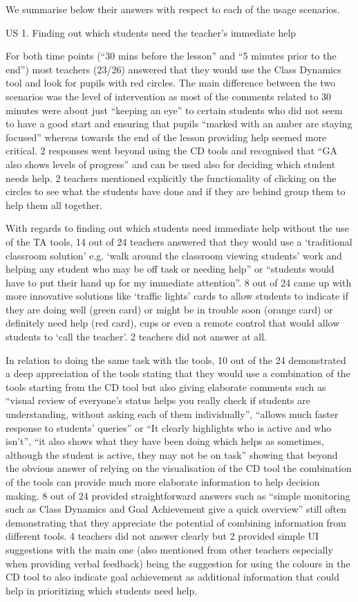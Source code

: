 We summarise below their answers with respect to each of the usage scenarios.

US 1. Finding out which students need the teacher’s immediate help
 
For both time points (“30 mins before the lesson” and “5 minutes prior
to the end”) most teachers (23/26) answered that they would use the
Class Dynamics tool and look for pupils with red circles. The main
difference between the two scenarios was the level of intervention as
most of the comments related to 30 minutes were about just “keeping an
eye” to certain students who did not seem to have a good start and
ensuring that pupils “marked with an amber are staying focused”
whereas towards the end of the lesson providing help seemed more
critical. 2 responses went beyond using the CD tools and recognised
that “GA also shows levels of progress” and can be used also for
deciding which student needs help. 2 teachers mentioned explicitly the
functionality of clicking on the circles to see what the students have
done and if they are behind group them to help them all together. 
 
With regards to finding out which students need immediate help without
the use of the TA tools, 14 out of 24 teachers answered that they
would use a ‘traditional classroom solution’ e.g. ‘walk around the
classroom viewing students’ work and helping any student who may be
off task or needing help” or “students would have to put their hand up
for my immediate attention”. 8 out of 24 came up with more innovative
solutions like ‘traffic lights’ cards to allow students to indicate if
they are doing well (green card) or might be in trouble soon (orange
card) or definitely need help (red card), cups or even a remote
control that would allow students to ‘call the teacher’. 2 teachers
did not answer at all.

In relation to doing the same task with the tools, 10 out of the 24
demonstrated a deep appreciation of the tools stating that they would
use a combination of the tools starting from the CD tool but also
giving elaborate comments such as “visual review of everyone’s status
helps you really check if students are understanding, without asking
each of them individually”, “allows much faster response to students’
queries” or “It clearly highlights who is active and who isn’t”, “it
also shows what they have been doing which helps as sometimes,
although the student is active, they may not be on task” showing that
beyond the obvious answer of relying on the visualisation of the CD
tool the combination of the tools can provide much more elaborate
information to help decision making. 8 out of 24 provided
straightforward answers such as “simple monitoring such as Class
Dynamics and Goal Achievement give a quick overview” still often
demonstrating that they appreciate the potential of combining
information from different tools. 4 teachers did not answer clearly
but 2 provided simple UI suggestions with the main one (also mentioned
from other teachers especially when providing verbal feedback) being
the suggestion for using the colours in the CD tool to also indicate
goal achievement as additional information that could help in
prioritizing which students need help. 
 
